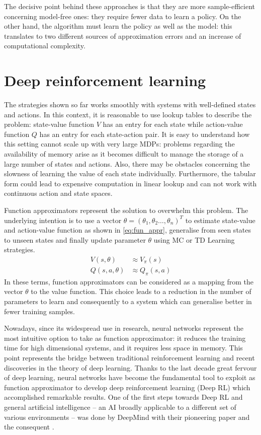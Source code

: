 The decisive point behind these approaches is that they are more sample-efficient concerning model-free ones: they require fewer data to learn a policy.
On the other hand, the algorithm must learn the policy as well as the model: this translates to two different sources of approximation errors and an increase of computational complexity.

\section{Deep reinforcement learning} \label{deepreinflearn}

The strategies shown so far works smoothly with systems with well-defined states and actions.
In this context, it is reasonable to use lookup tables to describe the problem: state-value function $V$ has an entry for each state while action-value function $Q$ has an entry for each state-action pair.
It is easy to understand how this setting cannot scale up with very large MDPs: problems regarding the availability of memory arise as it becomes difficult to manage the storage of a large number of states and actions.
Also, there may be obstacles concerning the slowness of learning the value of each state individually.
Furthermore, the tabular form could lead to expensive computation in linear lookup and can not work with continuous action and state spaces.

Function approximators represent the solution to overwhelm this problem.
The underlying intention is to use a vector $\theta = (\theta_1, \theta_2 \dots, \theta_n)^T$ to estimate state-value and action-value function as shown in \vref{eq:fun_appr}, generalise from seen states to unseen states and finally update parameter $\theta$ using MC or TD Learning strategies.
\begin{equation}\label{eq:fun_appr}
	\begin{aligned}
		V(s, \theta)    & \approx V_\pi(s)   \\
		Q(s, a, \theta) & \approx Q_\pi(s,a)
	\end{aligned}
\end{equation}
In these terms, function approximators can be considered as a mapping from the vector $\theta$ to the value function.
This choice leads to a reduction in the number of parameters to learn and consequently to a system which can generalise better in fewer training samples.

Nowadays, since its widespread use in research, neural networks represent the most intuitive option to take as function approximator: it reduces the training time for high dimensional systems, and it requires less space in memory.
This point represents the bridge between traditional reinforcement learning and recent discoveries in the theory of deep learning.
Thanks to the last decade great fervour of deep learning, neural networks have become the fundamental tool to exploit as function approximator to develop deep reinforcement learning (Deep RL) which accomplished remarkable results.
One of the first steps towards Deep RL and general artificial intelligence -- an AI broadly applicable to a different set of various environments -- was done by DeepMind with their pioneering paper \cite{mnih2013playing} and the consequent \cite{mnih2015human}.


